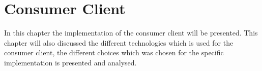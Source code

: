 \chapter{Consumer Client}\label{cha:consumer_client}
In this chapter the implementation of the consumer client will be presented.
This chapter will also discussed the different technologies which is used for the consumer client, the different choices which was chosen for the specific implementation is presented and analysed.
